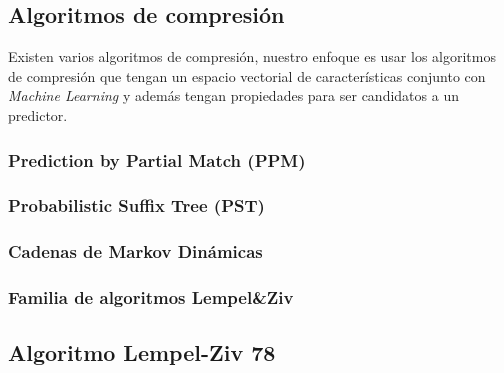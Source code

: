 \uncm
\subsection{Algoritmos de compresión}

Existen varios algoritmos de compresión, nuestro enfoque es usar los algoritmos de compresión que tengan un espacio vectorial de características conjunto con \emph{Machine Learning} y además tengan propiedades para ser candidatos a un predictor. 


\subsubsection{Prediction by Partial Match (PPM)}
	
 
\subsubsection{Probabilistic Suffix Tree (PST)}
 	

\subsubsection{Cadenas de Markov Dinámicas}
  	
 

\subsubsection{Familia de algoritmos Lempel\&Ziv}\label{ch2:sec-lzfamily}
	



\uncm
\subsection{Algoritmo Lempel-Ziv 78}
	














